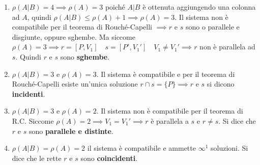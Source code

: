\documentclass[twoside]{report}
\begin{document}
\begin{enumerate}
    \item \(\rho(A|B) = 4 \implies \rho(A) = 3\) poiché \(A|B\) è ottenuta aggiungendo una colonna ad \(A\), quindi \(\rho(A|B) \le \rho(A) + 1 \implies \rho(A) =3 \). Il sistema non è compatibile per il teorema di Rouché-Capelli \(\implies r  \) e \(s\) sono o parallele e disgiunte, oppure sghembe. Ma siccome \(\rho(A) = 3 \implies r = [P,V_1] \quad s =[P', V_1'] \quad V_1 \neq V_1' \implies r\) non è parallela ad \(s\). Quindi \(r\) e \(s\) sono \textbf{sghembe}.
    \item \(\rho(A|B) = 3\) e \(\rho(A) =3\). Il sistema è compatibile e per il teorema di Rouché-Capelli  esiste un'unica soluzione \(r \cap s = \{P\} \implies r\) e \(s\) si dicono \textbf{incidenti}.
    \item \(\rho(A|B) = 3\) e \(\rho(A) = 2\). Il sistema non è compatibile per il teorema di R.C. Siccome \(\rho(A) =2 \implies V_1= V_1' \implies r\) è parallela a \(s\) e \(r \neq s\). Si dice che \(r\) e \(s\) sono \textbf{parallele e distinte}.
    \item \(\rho(A|B) = \rho(A) = 2\) il sistema è compatibile e ammette \(\infty^{1}\) soluzioni. Si dice che  le rette \(r\) e \(s\) sono \textbf{coincidenti}.
\end{enumerate}
\end{document}
